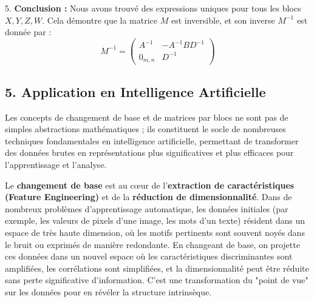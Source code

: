 \documentclass{report}
\begin{document}
5.  \textbf{Conclusion :}
    Nous avons trouvé des expressions uniques pour tous les blocs $X, Y, Z, W$. Cela démontre que la matrice $M$ est inversible, et son inverse $M^{-1}$ est donnée par :
    $$M^{-1} = \begin{pmatrix} A^{-1} & -A^{-1} B D^{-1} \\ 0_{m,n} & D^{-1} \end{pmatrix}$$

\subsection*{5. Application en Intelligence Artificielle}

Les concepts de changement de base et de matrices par blocs ne sont pas de simples abstractions mathématiques ; ils constituent le socle de nombreuses techniques fondamentales en intelligence artificielle, permettant de transformer des données brutes en représentations plus significatives et plus efficaces pour l'apprentissage et l'analyse.

Le \textbf{changement de base} est au cœur de l'\textbf{extraction de caractéristiques (Feature Engineering)} et de la \textbf{réduction de dimensionnalité}. Dans de nombreux problèmes d'apprentissage automatique, les données initiales (par exemple, les valeurs de pixels d'une image, les mots d'un texte) résident dans un espace de très haute dimension, où les motifs pertinents sont souvent noyés dans le bruit ou exprimés de manière redondante. En changeant de base, on projette ces données dans un nouvel espace où les caractéristiques discriminantes sont amplifiées, les corrélations sont simplifiées, et la dimensionnalité peut être réduite sans perte significative d'information. C'est une transformation du "point de vue" sur les données pour en révéler la structure intrinsèque.
\end{document}
